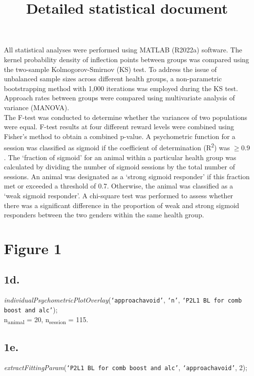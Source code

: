 \documentclass{article}
\title{Detailed statistical document}
\begin{document}
\maketitle

All statistical analyses were performed using MATLAB (R2022a) software. The kernel probability density of inflection points between groups was compared using the two-sample Kolmogorov-Smirnov (KS) test. To address the issue of unbalanced sample sizes across different health groups, a non-parametric bootstrapping method with 1,000 iterations was employed during the KS test. Approach rates between groups were compared using multivariate analysis of variance (MANOVA).\\

The F-test was conducted to determine whether the variances of two populations were equal. F-test results at four different reward levels were combined using Fisher's method to obtain a combined p-value. A psychometric function for a session was classified as sigmoid if the coefficient of determination (R\textsuperscript{2}) was $\geq 0.9$. The `fraction of sigmoid' for an animal within a particular health group was calculated by dividing the number of sigmoid sessions by the total number of sessions. An animal was designated as a `strong sigmoid responder' if this fraction met or exceeded a threshold of 0.7. Otherwise, the animal was classified as a `weak sigmoid responder'. A chi-square test was performed to assess whether there was a significant difference in the proportion of weak and strong sigmoid responders between the two genders within the same health group.\\

\section{Figure 1}
\subsection{1d.}
\emph{individualPsychometricPlotOverlay}(\texttt{`approachavoid'}, \texttt{`n'}, \texttt{`P2L1 BL for comb boost and alc'});\\
n\textsubscript{animal} = 20, n\textsubscript{session} = 115.

\subsection{1e.}
\emph{extractFittingParam}(\texttt{`P2L1 BL for comb boost and alc'}, \texttt{`approachavoid'}, 2);
\end{document}
